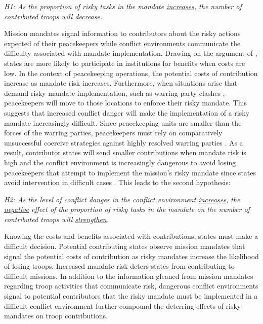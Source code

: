 \documentclass[12pt]{article}
\begin{document}
\begin{center}
\begin{singlespace}
\textit{H1: As the proportion of risky tasks in the mandate \ul{increases}, the number of contributed troops will \ul{decrease}.}
\end{singlespace}
\end{center}

Mission mandates signal information to contributors about the risky actions expected of their peacekeepers while conflict environments communicate the difficulty associated with mandate implementation. Drawing on the argument of \cite{downs1996}, states are more likely to participate in institutions for benefits when costs are low. In the context of peacekeeping operations, the potential costs of contribution increase as mandate risk increases. Furthermore, when situations arise that demand risky mandate implementation, such as warring party clashes \citep{phayal2020}, peacekeepers will move to those locations to enforce their risky mandate. This suggests that increased conflict danger will make the implementation of a risky mandate increasingly difficult. Since peacekeeping units are smaller than the forces of the warring parties, peacekeepers must rely on comparatively unsuccessful coercive strategies \citep{sullivan2007war} against highly resolved warring parties \citep{lloyd_diss}. As a result, contributor states will send smaller contributions when mandate risk is high and the conflict environment is increasingly dangerous to avoid losing peacekeepers that attempt to implement the mission's risky mandate since states avoid intervention in difficult cases \citep{iwanami2014}. This leads to the second hypothesis:

\begin{center}
\begin{singlespace}
\textit{H2: As the level of conflict danger in the conflict environment \underline{increases}, the \underline{negative} effect of the proportion of risky tasks in the mandate on the number of contributed troops will \underline{strengthen}.} 
\end{singlespace}
\end{center}

Knowing the costs and benefits associated with contributions, states must make a difficult decision. Potential contributing states observe mission mandates that signal the potential costs of contribution as risky mandates increase the likelihood of losing troops. Increased mandate risk deters states from contributing to difficult missions. In addition to the information gleaned from mission mandates regarding troop activities that communicate risk, dangerous conflict environments signal to potential contributors that the risky mandate must be implemented in a difficult conflict environment further compound the deterring effects of risky mandates on troop contributions. 
\end{document}
